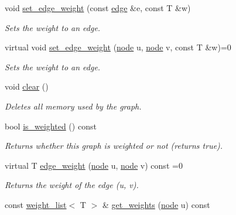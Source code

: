\begin{DoxyCompactItemize}
void \hyperlink{classlgraph_1_1wxgraph_a9779e7b5d0a767d4b3c61a7c9a4c2449}{set\+\_\+edge\+\_\+weight} (const \hyperlink{namespacelgraph_a76bd7d50719f03de7a85db259d80d572}{edge} \&e, const T \&w)
\begin{DoxyCompactList}\small\item\em Sets the weight to an edge. \end{DoxyCompactList}\item 
virtual void \hyperlink{classlgraph_1_1wxgraph_a463761d3fee15f119f214bb90c63dec2}{set\+\_\+edge\+\_\+weight} (\hyperlink{namespacelgraph_a397169dd66adf725210a30fb7251773e}{node} u, \hyperlink{namespacelgraph_a397169dd66adf725210a30fb7251773e}{node} v, const T \&w)=0
\begin{DoxyCompactList}\small\item\em Sets the weight to an edge. \end{DoxyCompactList}\item 
void \hyperlink{classlgraph_1_1wxgraph_a5ce8055002673c718131a091b3f17fc0}{clear} ()
\begin{DoxyCompactList}\small\item\em Deletes all memory used by the graph. \end{DoxyCompactList}\item 
\mbox{\label{classlgraph_1_1wxgraph_a5b1bd3a7ce3c6c628ccde1cf1c2ba130}} 
bool \hyperlink{classlgraph_1_1wxgraph_a5b1bd3a7ce3c6c628ccde1cf1c2ba130}{is\+\_\+weighted} () const
\begin{DoxyCompactList}\small\item\em Returns whether this graph is weighted or not (returns true). \end{DoxyCompactList}\item 
virtual T \hyperlink{classlgraph_1_1wxgraph_af5e23332680fdecb6db2fac3b3137982}{edge\+\_\+weight} (\hyperlink{namespacelgraph_a397169dd66adf725210a30fb7251773e}{node} u, \hyperlink{namespacelgraph_a397169dd66adf725210a30fb7251773e}{node} v) const =0
\begin{DoxyCompactList}\small\item\em Returns the weight of the edge ({\itshape u}, {\itshape v}). \end{DoxyCompactList}\item 
const \hyperlink{namespacelgraph_a1e0fd5ef0a78b2a92da48adbed265cb6}{weight\+\_\+list}$<$ T $>$ \& \hyperlink{classlgraph_1_1wxgraph_a468406b24e0d61a96b7106b845c5c718}{get\+\_\+weights} (\hyperlink{namespacelgraph_a397169dd66adf725210a30fb7251773e}{node} u) const

\end{DoxyCompactItemize}

